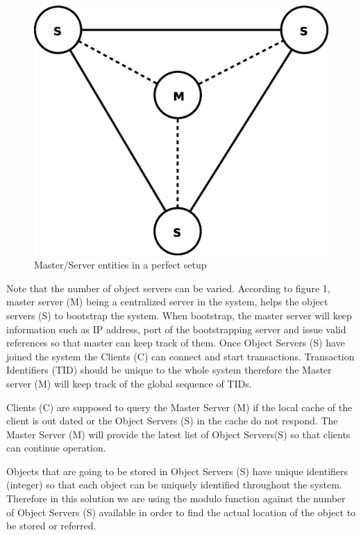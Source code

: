 \documentclass[times, 10pt,twocolumn]{article}
\begin{document}
\begin{figure}
\centering
\includegraphics[scale=0.3]{perfect.eps}
\caption{Master/Server entities in a perfect setup}
\label{fig:perf}
\end{figure}
Note that the number of object servers can be varied.
\label{sec:phase1}
According to figure 1, master server (M) being a centralized server in the system, helps the object servers (S) to bootstrap the system. When bootstrap, the master server will keep information such as
IP address, port of the bootstrapping server and issue valid references so that master can keep track of them. Once Object Servers (S) have joined the system the Clients (C) can connect 
and start transactions. Transaction Identifiers (TID) should be unique to the whole system therefore the Master server (M) will keep track of the global sequence of TIDs.

Clients (C) are supposed to query the Master Server (M) if the local cache of the client is out dated or the Object Servers (S) in the cache do not respond. The Master Server (M) will 
provide the latest list of Object Servers(S) so that clients can continue operation.

Objects that are going to be stored in Object Servers (S) have unique identifiers (integer) so that each object can be uniquely identified throughout the system. Therefore in this solution
we are using the modulo function against the number of Object Servers (S) available in order to find the actual location of the object to be stored or referred.
\end{document}
